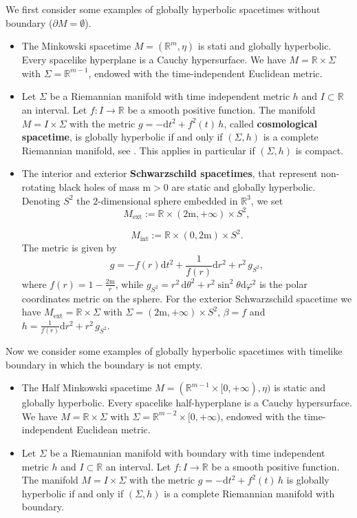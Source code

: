\begin{Example}
	We first consider some examples of globally hyperbolic spacetimes without boundary ($\partial M=\emptyset$).
	\begin{itemize}
		\item The Minkowski spacetime $M=(\mathbb{R}^m,\eta)$ is stati and globally hyperbolic. Every spacelike hyperplane is a Cauchy hypersurface. We have $M=\mathbb{R}\times \Sigma$ with $\Sigma = \mathbb{R}^{m-1}$, endowed with the time-independent Euclidean metric.
		\item Let $\Sigma$ be a Riemannian manifold with time independent metric $h$ and $I\subset\mathbb{R}$ an interval. Let $f: I\to\mathbb{R}$	be a smooth positive function. The manifold $M=I \times \Sigma$ with the metric $g = -\mathrm{d} t^2 + f^2(t)\, h$, called \textbf{cosmological spacetime}, is globally hyperbolic if and only if $(\Sigma,h)$ is a complete Riemannian manifold, see \cite[Lem A.5.14]{Baer-Ginoux-Pfaffle-07}. This applies in particular if $(\Sigma,h)$ is compact.
		\item The interior and exterior \textbf{Schwarzschild spacetimes}, that represent non-rotating black holes of mass $\mathrm{m}>0$ are static and globally hyperbolic.
		Denoting $S^2$ the $2$-dimensional sphere embedded in $\mathbb{R}^3$, we set
		\[	 M_{\text{ext}}:=\mathbb{R}\times(2\mathrm{m},+\infty)	\times S^2,	\] 
		
		\[	 M_{\text{int}}:=\mathbb{R}\times(0,2\mathrm{m})	\times S^2.	\] 
		The metric is given by
		\[	g=-f(r) \mathrm{d} t^2+\frac{1}{f(r)} \mathrm{d} r^2	+r^2\,g_{S^2},	\]
		where $f(r)=1-\frac{2\mathrm{m}}{r}$, while $g_{S^2}=r^2\, \mathrm{d}\theta^2+r^2\sin^2\theta \mathrm{d}\varphi^2$ is the polar coordinates metric on the sphere. For the exterior Schwarzschild spacetime we have $ M_{\text{ext}}=\mathbb{R}\times \Sigma$ with $\Sigma=(2\mathrm{m},+\infty)\times S^2$, $\beta=f$ and $h=\frac{1}{f(r)} \mathrm{d} r^2	+r^2\,g_{S^2}$.
	\end{itemize}
\end{Example}

\begin{Example}
	Now we consider some examples of globally hyperbolic spacetimes with timelike boundary in which the boundary is not empty.
	\begin{itemize}
		\item The Half Minkowski spacetime $M=(\mathbb{R}^{m-1}\times[0,+\infty),\eta)$ is static and globally hyperbolic. Every spacelike half-hyperplane is a Cauchy hypersurface. We have $M=\mathbb{R}\times \Sigma$ with $\Sigma= \mathbb{R}^{m-2}\times[0,+\infty)$, endowed with the time-independent Euclidean metric.
		\item Let $\Sigma$ be a Riemannian manifold with boundary with time independent metric $h$ and $I\subset\mathbb{R}$ an interval. Let $f: I\to\mathbb{R}$	be a smooth positive function. The manifold $M=I \times \Sigma$ with the metric $g = -\mathrm{d} t^2 + f^2(t)\, h$ is globally hyperbolic if and only if $(\Sigma,h)$ is a complete Riemannian manifold with boundary.
	\end{itemize}
\end{Example}

